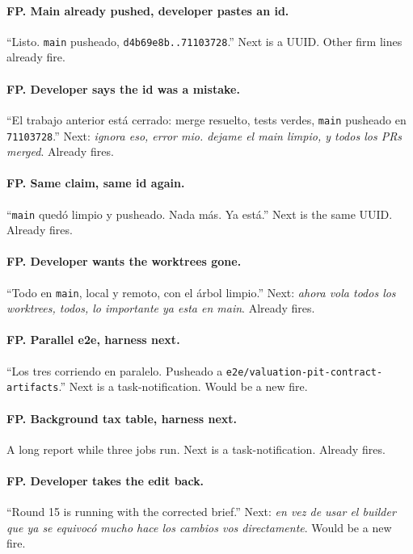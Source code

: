\paragraph{FP. Main already pushed, developer pastes an id.}
``Listo. \texttt{main} pusheado, \texttt{d4b69e8b..71103728}.''
Next is a UUID. Other firm lines already fire.

\paragraph{FP. Developer says the id was a mistake.}
``El trabajo anterior est\'a cerrado: merge resuelto, tests
verdes, \texttt{main} pusheado en \texttt{71103728}.'' Next:
\emph{ignora eso, error mio. dejame el main limpio, y todos los
PRs merged}. Already fires.

\paragraph{FP. Same claim, same id again.}
``\texttt{main} qued\'o limpio y pusheado. Nada m\'as. Ya
est\'a.'' Next is the same UUID. Already fires.

\paragraph{FP. Developer wants the worktrees gone.}
``Todo en \texttt{main}, local y remoto, con el \'arbol limpio.''
Next: \emph{ahora vola todos los worktrees, todos, lo importante
ya esta en main}. Already fires.

\paragraph{FP. Parallel e2e, harness next.}
``Los tres corriendo en paralelo. Pusheado a
\texttt{e2e/valuation-pit-contract-artifacts}.'' Next is a
task-notification. Would be a new fire.

\paragraph{FP. Background tax table, harness next.}
A long report while three jobs run. Next is a
task-notification. Already fires.

\paragraph{FP. Developer takes the edit back.}
``Round 15 is running with the corrected brief.'' Next:
\emph{en vez de usar el builder que ya se equivoc\'o mucho hace
los cambios vos directamente}. Would be a new fire.

